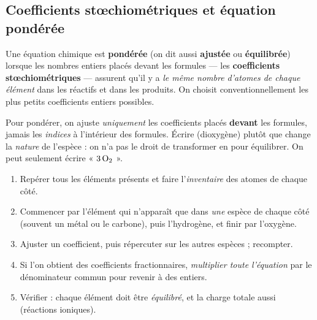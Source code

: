 \documentclass[11pt,a4paper]{article}
\begin{document}
\subsection{Coefficients stœchiométriques et équation pondérée}

\begin{definition}
Une équation chimique est \textbf{pondérée} (on dit aussi \textbf{ajustée} ou
\textbf{équilibrée}) lorsque les nombres entiers placés devant les formules — les
\textbf{coefficients stœchiométriques} — assurent qu'il y a \emph{le même nombre d'atomes de
chaque élément} dans les réactifs et dans les produits. On choisit conventionnellement les plus
petits coefficients entiers possibles.
\end{definition}

\begin{remarque}
Pour pondérer, on ajuste \emph{uniquement} les coefficients placés \textbf{devant} les formules,
jamais les \emph{indices} à l'intérieur des formules. Écrire  (dioxygène) plutôt que
 change la \emph{nature} de l'espèce : on n'a pas le droit de transformer  en
 pour équilibrer. On peut seulement écrire « $3\,\ce{O2}$ ».
\end{remarque}

\begin{methode}
\begin{enumerate}[leftmargin=1.8em,topsep=2pt,itemsep=2pt]
  \item Repérer tous les éléments présents et faire l'\emph{inventaire} des atomes de chaque côté.
  \item Commencer par l'élément qui n'apparaît que dans \emph{une} espèce de chaque côté
        (souvent un métal ou le carbone), puis l'hydrogène, et finir par l'oxygène.
  \item Ajuster un coefficient, puis répercuter sur les autres espèces ; recompter.
  \item Si l'on obtient des coefficients fractionnaires, \emph{multiplier toute l'équation} par le
        dénominateur commun pour revenir à des entiers.
  \item Vérifier : chaque élément doit être \emph{équilibré}, et la charge totale aussi (réactions ioniques).
\end{enumerate}
\end{methode}
\end{document}
